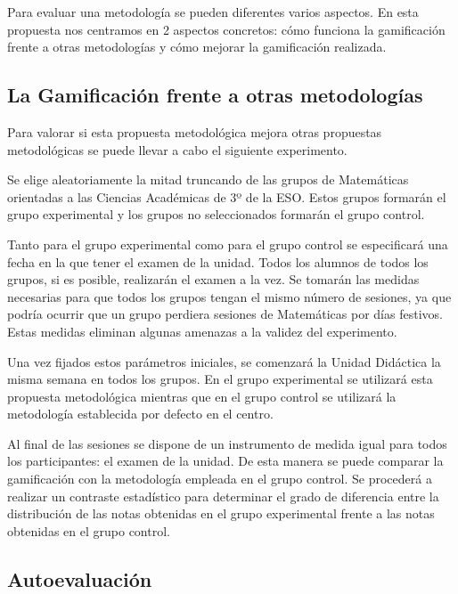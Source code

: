 
Para evaluar una metodología se pueden diferentes varios aspectos.
%
En esta propuesta nos centramos en 2 aspectos concretos:
%
cómo funciona la gamificación frente a otras metodologías y cómo mejorar la  gamificación realizada.

\label{evalGami}

\subsection{La Gamificación frente a otras metodologías}

Para valorar si esta propuesta metodológica mejora otras propuestas metodológicas se puede llevar a cabo el siguiente experimento.

Se elige aleatoriamente la mitad truncando de las grupos de Matemáticas orientadas a las Ciencias Académicas de 3º de la ESO.
%
Estos grupos formarán el grupo experimental y los grupos no seleccionados formarán el grupo control.

Tanto para el grupo experimental como para el grupo control se especificará una fecha en la que tener el examen de la unidad.
%
Todos los alumnos de todos los grupos, si es posible, realizarán el examen a la vez.
%
Se tomarán las medidas necesarias para que todos los grupos tengan el mismo número de sesiones, ya que podría ocurrir que un grupo perdiera sesiones de Matemáticas por días festivos.
%
Estas medidas eliminan algunas amenazas a la validez del experimento.

Una vez fijados estos parámetros iniciales, se comenzará la Unidad Didáctica la misma semana en todos los grupos.
%
En el grupo experimental se utilizará esta propuesta metodológica mientras que en el grupo control se utilizará la metodología establecida por defecto en el centro.

Al final de las sesiones se dispone de un instrumento de medida igual para todos los participantes: el examen de la unidad.
%
De esta manera se puede comparar la gamificación con la metodología empleada en el grupo control.
%
Se procederá a realizar un contraste estadístico para determinar el grado de diferencia entre la distribución de las notas obtenidas en el grupo experimental frente a las notas obtenidas en el grupo control.


\subsection{Autoevaluación}

